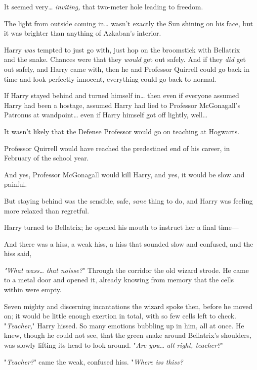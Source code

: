 It seemed very{\ldots} \emph{inviting,} that two-meter hole leading to freedom.

The light from outside coming in{\ldots} wasn't exactly the Sun shining on his 
face, but it was brighter than anything of Azkaban's interior.

Harry \emph{was} tempted to just go with, just hop on the broomstick with 
Bellatrix and the snake. Chances were that they \emph{would} get out safely. 
And if they \emph{did} get out safely, and Harry came with, then he and 
Professor Quirrell could go back in time and look perfectly innocent, 
everything could go back to normal.

If Harry stayed behind and turned himself in{\ldots} then even if everyone 
assumed Harry had been a hostage, assumed Harry had lied to Professor 
McGonagall's Patronus at wandpoint{\ldots} even if Harry himself got off 
lightly, well{\ldots}

It wasn't likely that the Defense Professor would go on teaching at Hogwarts.

Professor Quirrell would have reached the predestined end of his career, in 
February of the school year.

And yes, Professor McGonagall would kill Harry, and yes, it would be slow and 
painful.

But staying behind was the sensible, safe, \emph{sane} thing to do, and Harry 
was feeling more relaxed than regretful.

Harry turned to Bellatrix; he opened his mouth to instruct her a final time---

And there was a hiss, a weak hiss, a hiss that sounded slow and confused, and 
the hiss said,

\emph{"What wass{\ldots} that noisse?}"
\sbreak
Through the corridor the old wizard strode. He came to a metal door and opened 
it, already knowing from memory that the cells within were empty.

Seven mighty and discerning incantations the wizard spoke then, before he moved 
on; it would be little enough exertion in total, with so few cells left to 
check.
\sbreak
"\emph{Teacher,}" Harry hissed. So many emotions bubbling up in him, all at 
once. He knew, though he could not see, that the green snake around Bellatrix's 
shoulders, was slowly lifting its head to look around. "\emph{Are you{\ldots} 
all right, teacher?}"

"\emph{Teacher?}" came the weak, confused hiss. "\emph{Where iss thiss?} 

